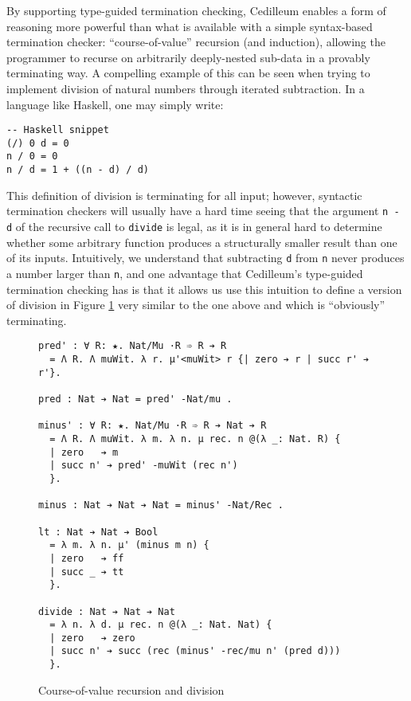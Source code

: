 \documentclass{article}
\begin{document}
By supporting type-guided termination checking, Cedilleum enables a form of
reasoning more powerful than what is available with a simple
syntax-based termination checker: ``course-of-value'' recursion (and induction),
allowing the programmer to recurse on arbitrarily deeply-nested sub-data in a
provably terminating way. A compelling example of this can be seen when trying
to implement division of natural numbers through iterated subtraction. In a
language like Haskell, one may simply write:
\begin{verbatim}
-- Haskell snippet
(/) 0 d = 0
n / 0 = 0
n / d = 1 + ((n - d) / d)
\end{verbatim}
This definition of division is terminating for all input; however, syntactic
termination checkers will usually have a hard time seeing that the argument
\texttt{n - d} of the recursive call to \texttt{divide} is legal, as it is in
general hard to determine whether some arbitrary function produces a
structurally smaller result than one of its inputs. Intuitively, we understand
that subtracting \texttt{d} from \texttt{n} never produces a number larger than
\texttt{n}, and one advantage that Cedilleum's type-guided termination checking
has is that it allows us use this intuition to define a version of division in
Figure \ref{fig:ex-data-div} very similar to the one above and which is
``obviously'' terminating.

\label{sec:hist-rec}
\begin{figure}[h]
\begin{verbatim}
pred' : ∀ R: ★. Nat/Mu ·R ➾ R ➔ R
  = Λ R. Λ muWit. λ r. μ'<muWit> r {| zero ➔ r | succ r' ➔ r'}.

pred : Nat ➔ Nat = pred' -Nat/mu .

minus' : ∀ R: ★. Nat/Mu ·R ➾ R ➔ Nat ➔ R
  = Λ R. Λ muWit. λ m. λ n. μ rec. n @(λ _: Nat. R) {
  | zero   ➔ m
  | succ n' ➔ pred' -muWit (rec n')
  }.

minus : Nat ➔ Nat ➔ Nat = minus' -Nat/Rec .

lt : Nat ➔ Nat ➔ Bool
  = λ m. λ n. μ' (minus m n) {
  | zero   ➔ ff
  | succ _ ➔ tt
  }.

divide : Nat ➔ Nat ➔ Nat
  = λ n. λ d. μ rec. n @(λ _: Nat. Nat) {
  | zero   ➔ zero
  | succ n' ➔ succ (rec (minus' -rec/mu n' (pred d)))
  }.
\end{verbatim}
  \caption{Course-of-value recursion and division}
  \label{fig:ex-data-div}
\end{figure}
\end{document}
